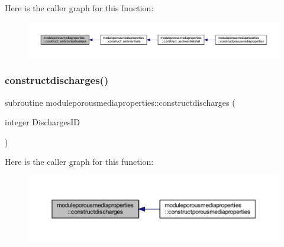 Here is the caller graph for this function\+:\nopagebreak
\begin{figure}[H]
\begin{center}
\leavevmode
\includegraphics[width=350pt]{namespacemoduleporousmediaproperties_a38a540abbf59777875ca535ba0683c59_icgraph}
\end{center}
\end{figure}
\mbox{\label{namespacemoduleporousmediaproperties_a6b8ea609b75df890d6efecde90bff1ac}} 
\subsubsection{\texorpdfstring{constructdischarges()}{constructdischarges()}}
{\footnotesize\ttfamily subroutine moduleporousmediaproperties\+::constructdischarges (\begin{DoxyParamCaption}\item[{integer}]{Discharges\+ID }\end{DoxyParamCaption})\hspace{0.3cm}{\ttfamily [private]}}

Here is the caller graph for this function\+:\nopagebreak
\begin{figure}[H]
\begin{center}
\leavevmode
\includegraphics[width=350pt]{namespacemoduleporousmediaproperties_a6b8ea609b75df890d6efecde90bff1ac_icgraph}
\end{center}
\end{figure}
\mbox{\label{namespacemoduleporousmediaproperties_aecdb9ca882593072d63d590749b53ee9}} 
